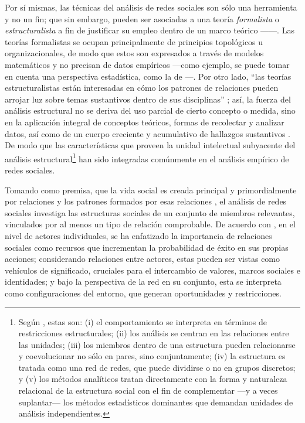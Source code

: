 \documentclass[letterpaper, 11pt]{book}
\theoremstyle{definition}
\theoremstyle{remark}
\begin{document}
Por sí mismas, las técnicas del análisis de redes sociales son sólo una herramienta y no un fin; que sin embargo, pueden ser asociadas a una teoría \emph{formalista} o \emph{estructuralista} a fin de justificar su empleo dentro de un marco teórico ---\citet{2011_Wellman_SNA_Introduction}---. 
Las teorías formalistas se ocupan principalmente de principios topológicos u organizacionales, de modo que estos son expresados a través de modelos matemáticos y no precisan de datos empíricos ---como ejemplo, se puede tomar en cuenta una perspectiva estadística, como la de \citet{2002_Barabasi_MechanicsOfComplexNetworks}---. 
Por otro lado, ``las teorías estructuralistas están interesadas en cómo los patrones de relaciones pueden arrojar luz sobre temas sustantivos dentro de sus disciplinas'' \citep[16]{2011_Wellman_SNA_Introduction}; 
así, la fuerza del análisis estructural no se deriva del uso parcial de cierto concepto o medida, sino en la aplicación integral de conceptos teóricos, formas de recolectar y analizar datos, así como de un cuerpo creciente y acumulativo de hallazgos sustantivos \citep[20]{1988_Wellman_StructuralAnalysis}. 
De modo que las características que proveen la unidad intelectual subyacente del análisis estructural\footnote{
    Según \citet{1988_Wellman_StructuralAnalysis}, estas son: 
    (i) el comportamiento se interpreta en términos de restricciones estructurales; 
    (ii) los análisis se centran en las relaciones entre las unidades; 
    (iii) los miembros dentro de una estructura pueden relacionarse y coevolucionar no sólo en pares, sino conjuntamente; 
    (iv) la estructura es tratada como una red de redes, que puede dividirse o no en grupos discretos; y 
    (v) los métodos analíticos tratan directamente con la forma y naturaleza relacional de la estructura social con el fin de complementar ---y a veces suplantar--- los métodos estadísticos dominantes que demandan unidades de análisis independientes. 
} 
han sido integradas comúnmente en el análisis empírico de redes sociales. 


Tomando como premisa, que la vida social es creada principal y primordialmente por relaciones y los patrones formados por esas relaciones \citep[11]{2011_Wellman_SNA_Introduction}, el análisis de redes sociales investiga las estructuras sociales de un conjunto de miembros relevantes, vinculados por al menos un tipo de relación comprobable. 
De acuerdo con \citet{2014_Caiani_SNA}, en el nivel de actores individuales, se ha enfatizado la importancia de relaciones sociales como recursos que incrementan la probabilidad de éxito en sus propias acciones; considerando relaciones entre actores, estas pueden ser vistas como vehículos de significado, cruciales para el intercambio de valores, marcos sociales e identidades; y bajo la perspectiva de la red en su conjunto, esta se interpreta como configuraciones del entorno, que generan oportunidades y restricciones. 
\end{document}
